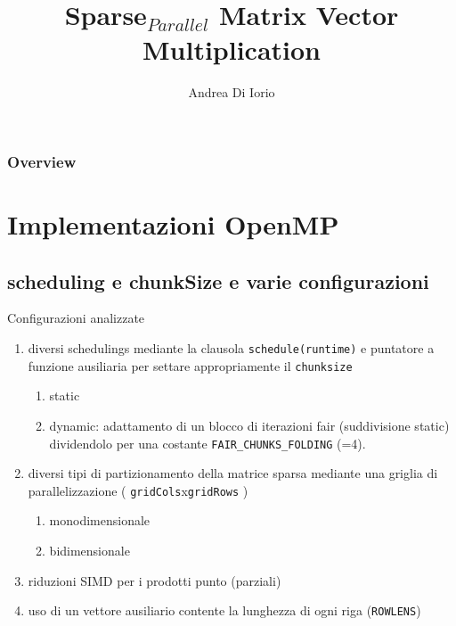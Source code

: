 \documentclass[aspectratio=1610]{beamer}
\title[SpMV]{Sparse$_{Parallel}$ Matrix Vector Multiplication}
\author{Andrea Di Iorio}
\date{}
\newcommand{\vvv}[1]{{\small\texttt{#1}}}
\begin{document}
\begin{frame}
	\maketitle %
\end{frame}

\begin{frame}
\frametitle{Overview} %
\tableofcontents %
\end{frame}

\section{Implementazioni OpenMP}
\subsection{scheduling e chunkSize e varie configurazioni}
\begin{frame}	{Configurazioni analizzate}
\begin{enumerate}
	\item 	diversi schedulings mediante la clausola \vvv{schedule(runtime)} 
			e puntatore a funzione ausiliaria per settare appropriamente il \vvv{chunksize}
		\begin{enumerate}
			\item static
			\item dynamic:
				adattamento di un blocco di iterazioni fair (suddivisione static)
				dividendolo per una costante \vvv{FAIR\_CHUNKS\_FOLDING} (=4).\\
		\end{enumerate}
	\pause
	\item diversi tipi di partizionamento della matrice sparsa mediante una
		  griglia di parallelizzazione ( \vvv{gridCols}x\vvv{gridRows} )
		\begin{enumerate}
			\item	monodimensionale
			\item	bidimensionale
		\end{enumerate}
	\pause
	\item riduzioni SIMD per i prodotti punto (parziali)
	\pause
	\item uso di un vettore ausiliario contente la lunghezza di ogni riga (\vvv{ROWLENS})
\end{enumerate}
\end{frame}
\end{document}
